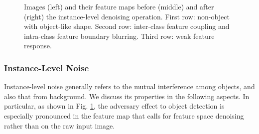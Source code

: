 \documentclass[10pt,journal,compsoc]{IEEEtran}
\begin{document}
\begin{figure}[!tb]
	\centering
	\caption{Images (left) and their feature maps before (middle) and after (right) the instance-level denoising operation. First row: non-object with  object-like shape. Second row: inter-class feature coupling and intra-class feature boundary blurring. Third row: weak feature response.}
	\label{fig:denoise_visualize}
\end{figure}

\subsubsection{Instance-Level Noise}\label{subsec:inld_noise}




Instance-level noise generally refers to the mutual interference among objects, and also that from background. We discuss its properties in the following aspects. In particular, as shown in Fig. \ref{fig:denoise_visualize}, the adversary effect to object detection is especially pronounced in the feature map that calls for feature space denoising rather than on the raw input image.
\end{document}
